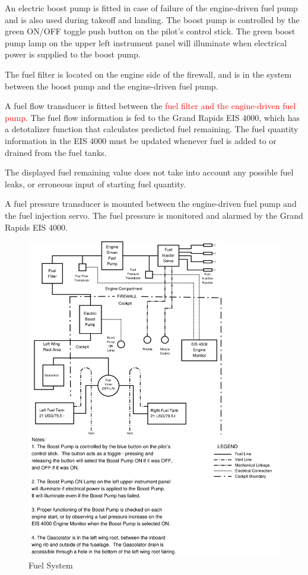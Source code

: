 An electric boost pump is fitted in case of failure of the engine-driven fuel pump and is also used during takeoff and landing. The boost pump is controlled by the green ON/OFF toggle push button on the pilot's control stick. The green boost pump lamp on the upper left instrument panel will illuminate when electrical power is supplied to the boost pump.

The fuel filter is located on the engine side of the firewall, and is in the system between the boost pump and the engine-driven fuel pump.

A fuel flow transducer is fitted between the \textcolor{red}{fuel filter and the engine-driven fuel pump}. The fuel flow information is fed to the Grand Rapids EIS 4000, which has a detotalizer function that calculates predicted fuel remaining. The fuel quantity information in the EIS 4000 must be updated whenever fuel is added to or drained from the fuel tanks.
\begin{Note}[WARNING]The displayed fuel remaining value does not take into account any possible fuel leaks, or erroneous input of starting fuel quantity. 
\end{Note}

A fuel pressure transducer is mounted between the engine-driven fuel pump and the fuel injection servo. The fuel pressure is monitored and alarmed by the Grand Rapids EIS 4000.
\begin{figure}
[hb!] 
\begin{center}
\includegraphics*[scale = 0.4]{../Diagrams/Fuel_system4}
\end{center}

%
\caption{Fuel System} 
\end{figure}
\clearpage 

